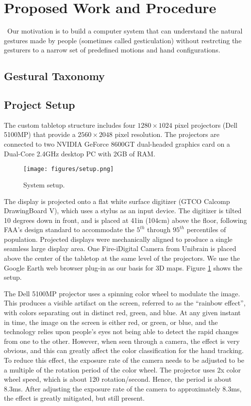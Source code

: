 \section{Proposed Work and Procedure}\
Our motivation is to build a computer system that can understand the natural
gestures made by people (sometimes called gesticulation) without restrcting the
gesturers to a narrow set of predefined motions and hand configurations.

\subsection{Gestural Taxonomy}

\subsection{Project Setup}
The custom tabletop structure includes four $1280\times1024$ pixel projectors (Dell 5100MP) that provide a $2560\times2048$ pixel resolution. The projectors are connected to two NVIDIA GeForce 8600GT dual-headed graphics card on a Dual-Core 2.4GHz desktop PC with 2GB of RAM.

\begin{figure}
	\centering
	\texttt{[image: figures/setup.png]} 
	\caption{System setup.} \label{fig:setup}
\end{figure}

The display is projected onto a flat white surface digitizer (GTCO Calcomp DrawingBoard V), which uses a stylus as an input device. The digitizer is tilted 10 degrees down in front, and is placed at 41in (104cm) above the floor, following FAA's design standard to accommodate the $5^{th}$ through $95^{th}$ percentiles of population. Projected displays were mechanically aligned to produce a single seamless large display area. One Fire-i\texttrademark Digital Camera from Unibrain is placed above the center of the tabletop at the same level of the projectors. We use the Google Earth web browser plug-in as our basis for 3D maps. Figure \ref{fig:setup} shows the setup.

The Dell 5100MP projector uses a spinning color wheel to modulate the image. This produces a visible artifact on the screen, referred to as the ``rainbow effect'', with colors separating out in distinct red, green, and blue. At any given instant in time, the image on the screen is either red, or green, or blue, and the technology relies upon people's eyes not being able to detect the rapid changes from one to the other. However, when seen through a camera, the effect is very obvious, and this can greatly affect the color classification for the hand tracking. To reduce this effect, the exposure rate of the camera needs to be adjusted to be a multiple of the rotation period of the color wheel. The projector uses 2x color wheel speed, which is about 120 rotation/second. Hence, the period is about 8.3ms. After adjusting the exposure rate of the camera to approximately 8.3ms, the effect is greatly mitigated, but still present. 

